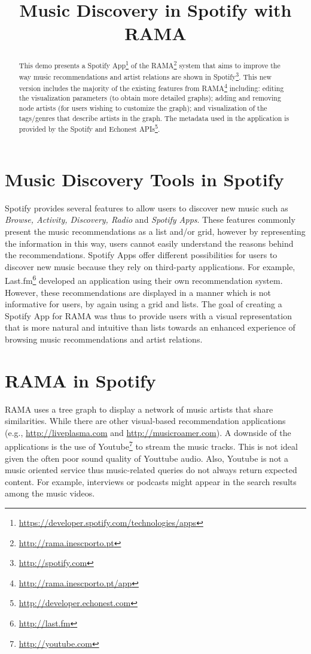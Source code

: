 \documentclass{article}
\title{Music Discovery in Spotify with RAMA}
\begin{document}
\maketitle

\begin{abstract}
  This demo presents a Spotify App\footnote{\url{https://developer.spotify.com/technologies/apps}} of the RAMA\footnote{\url{http://rama.inescporto.pt}} system that aims to improve the way music recommendations and artist relations are shown in Spotify\footnote{\url{http://spotify.com}}.  This new version includes the majority of the existing features from RAMA\footnote{\url{http://rama.inescporto.pt/app}} including: editing the visualization parameters (to obtain more detailed graphs); adding and removing node artists (for users wishing to customize the graph); and visualization of the tags/genres that describe artists in the graph.
  The metadata used in the application is provided by the Spotify and Echonest APIs\footnote{\url{http://developer.echonest.com}}.
\end{abstract}

  \section{Music Discovery Tools in Spotify}
  \label{sec:spotify_tools}
  

    Spotify provides several features to allow users to discover new music such as \textit{Browse, Activity, Discovery, Radio} and \textit{Spotify Apps}.
    These features commonly present the music recommendations as a list and/or grid, however by representing the information in this way, users cannot easily understand the reasons behind the recommendations. 
    Spotify Apps offer different possibilities for users to discover new music because they rely on third-party applications. For example, Last.fm\footnote{\url{http://last.fm}} developed an application using their own recommendation system.
  However, these recommendations are displayed in a manner which is not informative for users, by again using a grid and lists. 
    The goal of creating a Spotify App for RAMA was thus to provide users with a visual representation that is more natural and intuitive than lists towards an enhanced experience of browsing music recommendations and artist relations. 

  \section{RAMA in Spotify}
  \label{sec:rama}
  \sloppy
  RAMA uses a tree graph to display a network of music artists that share similarities.
  While there are other visual-based recommendation applications (e.g., \url{http://liveplasma.com} and \url{http://musicroamer.com}).
  A downside of the applications is the use of Youtube\footnote{\url{http://youtube.com}} to stream the music tracks.
  This is not ideal given the often poor sound quality of Youttube audio. Also, Youtube is not a music oriented service thus music-related queries do not always return expected content. For example, interviews or podcasts might appear in the search results among the music videos.
\end{document}
